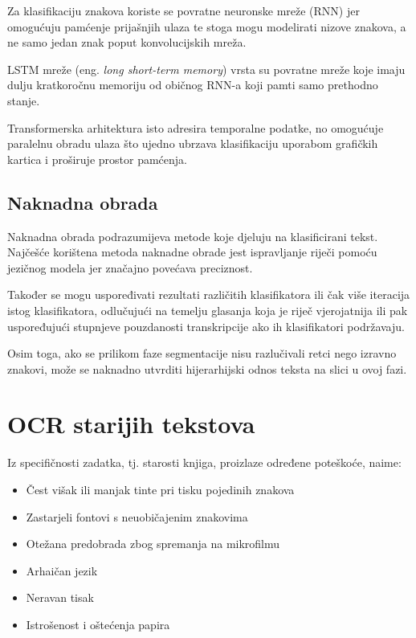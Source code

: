 \documentclass[zavrsnirad]{fer}
\begin{document}
Za klasifikaciju znakova koriste se povratne neuronske mreže (RNN) jer omogućuju pamćenje prijašnjih ulaza te stoga mogu modelirati nizove znakova, a ne samo jedan znak poput konvolucijskih mreža.

LSTM mreže \cite{Breuel2013} (eng. \textit{long short-term memory}) vrsta su povratne mreže koje imaju dulju kratkoročnu memoriju od običnog RNN-a koji pamti samo prethodno stanje.

Transformerska arhitektura \cite{Vaswani2023} isto adresira temporalne podatke, no omogućuje paralelnu obradu ulaza što ujedno ubrzava klasifikaciju uporabom grafičkih kartica i proširuje prostor pamćenja.

\section{Naknadna obrada}

Naknadna obrada podrazumijeva metode koje djeluju na klasificirani tekst. Najčešće korištena metoda naknadne obrade jest ispravljanje riječi pomoću jezičnog modela jer značajno povećava preciznost.

Također se mogu uspoređivati rezultati različitih klasifikatora ili čak više iteracija istog klasifikatora, odlučujući na temelju glasanja koja je riječ vjerojatnija ili pak uspoređujući stupnjeve pouzdanosti transkripcije ako ih klasifikatori podržavaju. \cite{Boiangiu2016}

Osim toga, ako se prilikom faze segmentacije nisu razlučivali retci nego izravno znakovi, može se naknadno utvrditi hijerarhijski odnos teksta na slici u ovoj fazi.

\chapter{OCR starijih tekstova}
\label{pog:ocr_starijih_tekstova}

Iz specifičnosti zadatka, tj. starosti knjiga,  proizlaze određene poteškoće, naime:
\begin{itemize}
	\item Čest višak ili manjak tinte pri tisku pojedinih znakova
	\item Zastarjeli fontovi s neuobičajenim znakovima
	\item Otežana predobrada zbog spremanja na mikrofilmu
	\item Arhaičan jezik
	\item Neravan tisak
	\item Istrošenost i oštećenja papira
\end{itemize}
\end{document}
